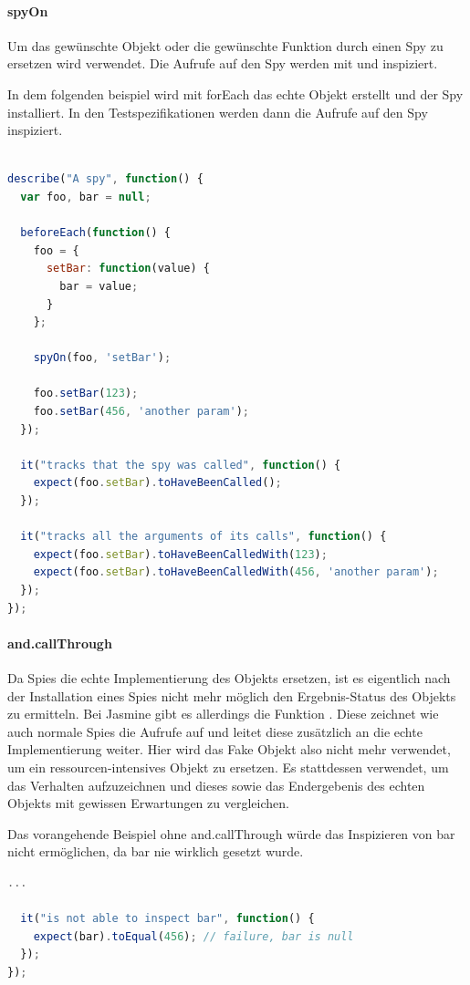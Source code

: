 \paragraph{spyOn}
Um das gewünschte Objekt oder die gewünschte Funktion durch einen Spy zu ersetzen wird  verwendet. Die Aufrufe auf den Spy werden mit  und  inspiziert.

In dem folgenden beispiel wird mit forEach das echte Objekt erstellt und der Spy installiert. In den Testspezifikationen werden dann die Aufrufe auf den Spy inspiziert.

\begin{lstlisting}[language=JavaScript]

describe("A spy", function() {
  var foo, bar = null;

  beforeEach(function() {
    foo = {
      setBar: function(value) {
        bar = value;
      }
    };

    spyOn(foo, 'setBar');

    foo.setBar(123);
    foo.setBar(456, 'another param');
  });

  it("tracks that the spy was called", function() {
    expect(foo.setBar).toHaveBeenCalled();
  });

  it("tracks all the arguments of its calls", function() {
    expect(foo.setBar).toHaveBeenCalledWith(123);
    expect(foo.setBar).toHaveBeenCalledWith(456, 'another param');
  });
});

\end{lstlisting}

\paragraph{and.callThrough}
Da Spies die echte Implementierung des Objekts ersetzen, ist es eigentlich nach der Installation eines Spies nicht mehr möglich den Ergebnis-Status des Objekts zu ermitteln. Bei Jasmine gibt es allerdings die Funktion . Diese zeichnet wie auch normale Spies die Aufrufe auf und leitet diese zusätzlich an die echte Implementierung weiter. Hier wird das Fake Objekt also nicht mehr verwendet, um ein ressourcen-intensives Objekt zu ersetzen. Es stattdessen verwendet, um das Verhalten aufzuzeichnen und dieses sowie das Endergebenis des echten Objekts mit gewissen Erwartungen zu vergleichen.

Das vorangehende Beispiel ohne and.callThrough würde das Inspizieren von bar nicht ermöglichen, da bar nie wirklich gesetzt wurde.
\begin{lstlisting}[language=JavaScript]
  ...

  it("is not able to inspect bar", function() {
    expect(bar).toEqual(456); // failure, bar is null
  });
});
\end{lstlisting}

